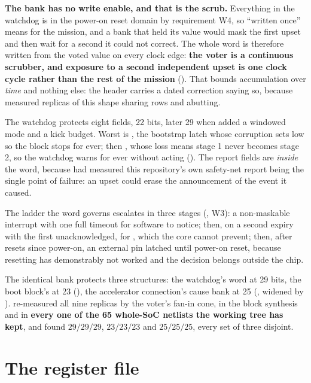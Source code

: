 \textbf{The bank has no write enable, and that is the scrub.}
Everything in the watchdog is in the power-on reset domain by
requirement W4, so ``written once'' means for the mission, and a bank
that held its value would mask the first upset and then wait for a
second it could not correct. The whole word is therefore written from
the voted value on every clock edge: \textbf{the voter is a continuous
scrubber, and exposure to a second independent upset is one clock cycle
rather than the rest of the mission} (). That
bounds accumulation over \emph{time} and nothing else: the header
carries a dated correction saying so, because 
measured replicas of this shape sharing rows and abutting.

The watchdog protects eight fields, 22 bits, later 29 when 
added a windowed mode and a kick budget. Worst is , the
bootstrap latch whose corruption sets  low so the block
stops for ever; then , whose loss means stage 1 never
becomes stage 2, so the watchdog warns for ever without acting
(). The report fields are \emph{inside} the
word, because  had measured this repository's own
safety-net report being the single point of failure: an upset could
erase the announcement of the event it caused.

The ladder the word governs escalates in three stages
(, W3): a non-maskable interrupt with one
full timeout for software to notice; then, on a second expiry with the
first unacknowledged,  for , which
the core cannot prevent; then, after  resets since
power-on, an external pin latched until power-on reset, because
resetting has demonstrably not worked and the decision belongs outside
the chip.

The identical bank protects three structures: the watchdog's word at 29
bits, the boot block's at 23 (), the accelerator connection's
cause bank at 25 (, widened by ).
 re-measured all nine replicas by the voter's
fan-in cone, in the block synthesis and in \textbf{every one of the 65
whole-SoC netlists the working tree has kept}, and found $29/29/29$,
$23/23/23$ and $25/25/25$, every set of three disjoint.

\section{The register file}
\label{sec:harden-regfile}

